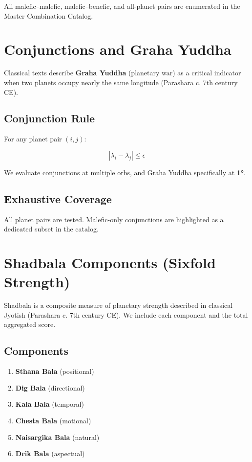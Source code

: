\documentclass[
  11pt,
  a4paper,
  oneside,
  openany]{article}
\providecommand{\tightlist}{%
  \setlength{\itemsep}{0pt}\setlength{\parskip}{0pt}}\usepackage{longtable,booktabs,array}
\begin{document}
All malefic--malefic, malefic--benefic, and all-planet pairs are
enumerated in the Master Combination Catalog.

\section{Conjunctions and Graha
Yuddha}\label{conjunctions-and-graha-yuddha}

Classical texts describe \textbf{Graha Yuddha} (planetary war) as a
critical indicator when two planets occupy nearly the same longitude
(Parashara c. 7th century CE).

\subsection{Conjunction Rule}\label{conjunction-rule}

For any planet pair \((i,j)\):

\[
|\lambda_i - \lambda_j| \leq \epsilon
\]

We evaluate conjunctions at multiple orbs, and Graha Yuddha specifically
at \textbf{1°}.

\subsection{Exhaustive Coverage}\label{exhaustive-coverage-1}

All planet pairs are tested. Malefic-only conjunctions are highlighted
as a dedicated subset in the catalog.

\section{Shadbala Components (Sixfold
Strength)}\label{shadbala-components-sixfold-strength}

Shadbala is a composite measure of planetary strength described in
classical Jyotish (Parashara c. 7th century CE). We include each
component and the total aggregated score.

\subsection{Components}\label{components}

\begin{enumerate}
\def\labelenumi{\arabic{enumi}.}
\tightlist
\item
  \textbf{Sthana Bala} (positional)
\item
  \textbf{Dig Bala} (directional)
\item
  \textbf{Kala Bala} (temporal)
\item
  \textbf{Chesta Bala} (motional)
\item
  \textbf{Naisargika Bala} (natural)
\item
  \textbf{Drik Bala} (aspectual)
\end{enumerate}
\end{document}
